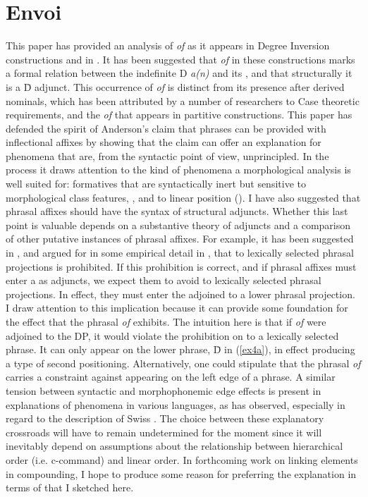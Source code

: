 \documentclass[output=paper,
modfonts
]{LSP/langsci}
\begin{document}
\section{Envoi}
This paper has provided an analysis of {\textit{of}} as it appears in Degree Inversion constructions and in .  It has been suggested that {\textit{of}} in these constructions marks a formal relation between the indefinite D {\textit{a(n)}} and its , and that structurally it is a \=D adjunct.  This occurrence of {\textit{of}} is distinct from its presence after derived nominals, which has been attributed by a number of researchers to Case theoretic requirements, and the {\textit{of}} that appears in partitive constructions.  This paper has defended the spirit of Anderson's claim that phrases can be provided with inflectional affixes by showing that the claim can offer an explanation for phenomena that are, from the syntactic point of view, unprincipled.  In the process it draws attention to the kind of phenomena a morphological analysis is well suited for:  formatives that are syntactically inert but sensitive to morphological class features, , and to linear position ().  I have also suggested that phrasal affixes should have the syntax of structural adjuncts.  Whether this last point is valuable depends on a substantive theory of adjuncts and a comparison of other putative instances of phrasal affixes.  For example, it has been suggested in {\citet{Chomsky86}}, and argued for in some empirical detail in {\citet{McCloskey96}}, that  to lexically selected phrasal projections is prohibited.  If this  prohibition is correct, and if phrasal affixes must enter a  as adjuncts, we expect them to avoid  to lexically selected phrasal projections.  In effect, they must enter the  adjoined to a lower phrasal projection.  I draw attention to this implication because it can provide some foundation for the  effect that the phrasal  {\textit{of}} exhibits.  The intuition here is that if {\textit{of}} were adjoined to the DP, it would violate the prohibition on  to a lexically selected phrase.  It can only appear on the lower phrase, \=D in ({\ref{ex4a}}), in effect producing a type of second positioning.  Alternatively, one could stipulate that the phrasal  {\textit{of}} carries a constraint against appearing on the left edge of a phrase.  A similar tension between syntactic and morphophonemic edge effects is present in explanations of  phenomena in various languages, as {\citet{Anderson05}} has observed, especially in regard to the description of Swiss .  The choice between these explanatory crossroads will have to remain undetermined for the moment since it will inevitably depend on assumptions about the relationship between hierarchical order (i.e. c-command) and linear order.  In forthcoming work on linking elements in  compounding, I hope to produce some reason for preferring the explanation in terms of  that I sketched here.
 

{\sloppy
\printbibliography[heading=subbibliography,notkeyword=this]
}
\end{document}
